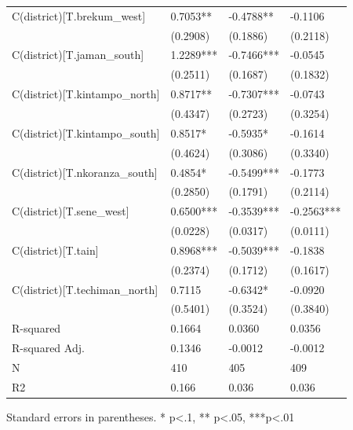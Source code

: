 \begin{table}
\begin{center}
\begin{tabular}{llll}
C(district)[T.brekum\_west]    & 0.7053**           & -0.4788**          & -0.1106               \\
                               & (0.2908)           & (0.1886)           & (0.2118)              \\
C(district)[T.jaman\_south]    & 1.2289***          & -0.7466***         & -0.0545               \\
                               & (0.2511)           & (0.1687)           & (0.1832)              \\
C(district)[T.kintampo\_north] & 0.8717**           & -0.7307***         & -0.0743               \\
                               & (0.4347)           & (0.2723)           & (0.3254)              \\
C(district)[T.kintampo\_south] & 0.8517*            & -0.5935*           & -0.1614               \\
                               & (0.4624)           & (0.3086)           & (0.3340)              \\
C(district)[T.nkoranza\_south] & 0.4854*            & -0.5499***         & -0.1773               \\
                               & (0.2850)           & (0.1791)           & (0.2114)              \\
C(district)[T.sene\_west]      & 0.6500***          & -0.3539***         & -0.2563***            \\
                               & (0.0228)           & (0.0317)           & (0.0111)              \\
C(district)[T.tain]            & 0.8968***          & -0.5039***         & -0.1838               \\
                               & (0.2374)           & (0.1712)           & (0.1617)              \\
C(district)[T.techiman\_north] & 0.7115             & -0.6342*           & -0.0920               \\
                               & (0.5401)           & (0.3524)           & (0.3840)              \\
R-squared                      & 0.1664             & 0.0360             & 0.0356                \\
R-squared Adj.                 & 0.1346             & -0.0012            & -0.0012               \\
N                              & 410                & 405                & 409                   \\
R2                             & 0.166              & 0.036              & 0.036                 \\
\hline
\end{tabular}
\end{center}
\end{table}
\bigskip
Standard errors in parentheses. \newline 
* p<.1, ** p<.05, ***p<.01